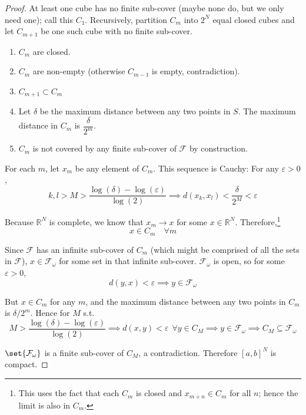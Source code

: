 \documentclass{article}
\begin{document}
\begin{proof}
  At least one cube has no finite sub-cover (maybe none do, but we only need one); call this $C_1$. Recursively, partition $C_m$ into $2^N$ equal closed cubes and let $C_{m + 1}$ be one such cube with no finite sub-cover.
  \begin{enumerate}
    \item $C_m$ are closed.

    \item $C_m$ are non-empty (otherwise $C_{m - 1}$ is empty, contradiction).

    \item $C_{m + 1} \subset C_m$

    \item Let $\delta$ be the maximum distance between any two points in $S$. The maximum distance in $C_m$ is $\dfrac{\delta}{2^m}$.

    \item $C_m$ is not covered by any finite sub-cover of $\mathcal{F}$ by construction.
  \end{enumerate}

  For each $m$, let $x_m$ be any element of $C_m$. This sequence is Cauchy: For any $\varepsilon > 0$,
  \[
    k, l > M > \dfrac{\log(\delta) - \log(\varepsilon)}{\log(2)}
    \implies
    d(x_k, x_l)
    <
    \dfrac{\delta}{2^M}
    <
    \varepsilon
  \]

  Because $\mathbb{R}^N$ is complete, we know that $x_m \to x$ for some $x \in \mathbb{R}^N$. Therefore,\footnote{This uses the fact that each $C_m$ is closed and $x_{m + n} \in C_m$ for all $n$; hence the limit is also in $C_m$.}
  \[
    x \in C_m
    \quad
    \forall m
  \]

  Since $\mathcal{F}$ has an infinite sub-cover of $C_m$ (which might be comprised of all the sets in $\mathcal{F}$), $x \in \mathcal{F}_\omega$ for some set in that infinite sub-cover. $\mathcal{F}_\omega$ is open, so for some $\varepsilon > 0$,
  \[
    d(y, x) < \varepsilon \implies y \in \mathcal{F}_\omega
  \]

  But $x \in C_m$ for any $m$, and the maximum distance between any two points in $C_m$ is $\delta / 2^m$. Hence for $M$ s.t.
  \[
    M > \dfrac{\log(\delta) - \log(\varepsilon)}{\log(2)}
    \implies
    d(x, y) < \varepsilon ~~ \forall y \in C_M
    \implies
    y \in \mathcal{F}_\omega
    \implies
    C_M \subseteq \mathcal{F}_\omega
  \]

  $\set{\mathcal{F}_\omega}$ is a finite sub-cover of $C_M$, a contradiction. Therefore $[a, b]^N$ is compact.
\end{proof}
\end{document}
